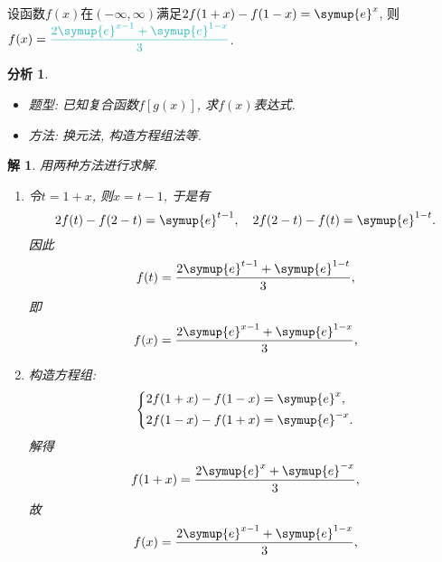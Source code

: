 \documentclass[a4paper, 12pt]{ctexart}
\theoremstyle{plain}
\theoremstyle{nonumberplain}
\newtheorem{solution}{解}
\theoremstyle{nonumberplain}
\newtheorem{analysis}{分析}
\theoremstyle{nonumberplain}
\newcommand{\ans}[1]{\textcolor{Aquamarine}{#1}}
\newcommand{\me}{\symup{e}}
\begin{document}
    \begin{problem}
        设函数$f(x)$在$(-\infty, \infty)$满足$2f(1+x)-f(1-x)=\me^x$, 则$\displaystyle f(x)=\ans{\frac{2\me^{x-1}+\me^{1-x}}{3}}$.
    \end{problem}
    \begin{analysis}\hspace{\fill}
        \begin{itemize}
            \item 题型: 已知复合函数$f[g(x)]$, 求$f(x)$表达式.
            \item 方法: 换元法, 构造方程组法等.
        \end{itemize}
    \end{analysis}
    \begin{solution}
        用两种方法进行求解.
        \begin{enumerate}[\hspace{2em}法1:]
            \item 令$t=1+x$, 则$x=t-1$, 于是有
                \begin{equation}
                    2f(t)-f(2-t)=\me^{t-1},\quad 2f(2-t)-f(t)=\me^{1-t}.
                \end{equation}
                因此
                \begin{equation}
                    f(t)=\frac{2\me^{t-1}+\me^{1-t}}{3},
                \end{equation}
                即
                \begin{equation}
                    f(x)=\frac{2\me^{x-1}+\me^{1-x}}{3},
                \end{equation}
            \item 构造方程组:
                \begin{equation}
                    \left\{\begin{aligned}
                        2f(1+x)-f(1-x)&=\me^x,\\
                        2f(1-x)-f(1+x)&=\me^{-x}.
                    \end{aligned}\right.
                \end{equation}
                解得
                \begin{equation}
                    f(1+x)=\frac{2\me^x+\me^{-x}}{3},
                \end{equation}
                故
                \begin{equation}
                    f(x)=\frac{2\me^{x-1}+\me^{1-x}}{3},
                \end{equation}
        \end{enumerate}
    \end{solution}
\end{document}
